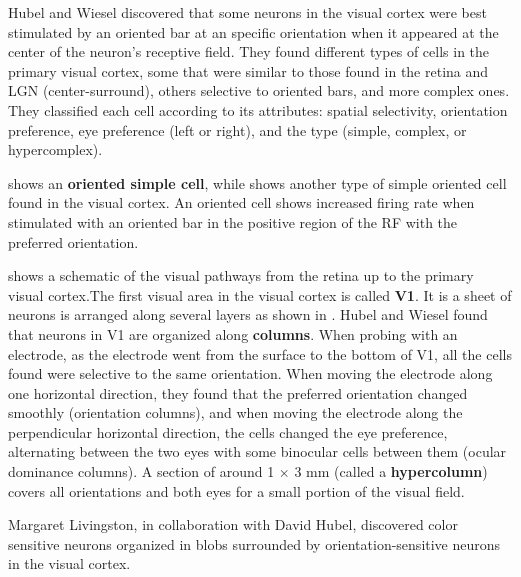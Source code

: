 Hubel and Wiesel discovered that some neurons in the visual cortex were best stimulated by an oriented bar at an specific orientation when it appeared at the center of the neuron's receptive field. They found different types of cells in the primary visual cortex, some that were similar to those found in the retina and LGN (center-surround), others selective to oriented bars, and more complex ones.
They classified each cell according to its attributes: spatial selectivity, orientation preference, eye preference (left or right), and the type (simple, complex, or hypercomplex).

 shows an {\bf oriented simple cell}, while  shows another type of simple oriented cell found in the visual cortex. An oriented cell shows increased firing rate when stimulated with an oriented bar in the positive region of the RF with the preferred orientation.

\Fig{\ref{fig:visual_pathways}}
shows a schematic of the visual pathways from the retina up to the primary visual cortex.The first visual area in the visual cortex is called {\bf V1}. It is a sheet of neurons is arranged along several layers as shown in \fig{\ref{fig:visual_pathways}}. %
Hubel and Wiesel found that neurons in V1 are organized along {\bf columns}. When probing with an electrode, as the electrode went from the surface to the bottom of V1, all the cells found were selective to the same orientation. When moving the electrode along one horizontal direction, they found that the preferred orientation changed smoothly (orientation columns), and when moving the electrode along the perpendicular horizontal direction, the cells changed the eye preference, alternating between the two eyes with some binocular cells between them (ocular dominance columns). A section of around 1 $\times$ 3 mm (called a {\bf hypercolumn})
covers all orientations and both eyes for a small portion of the visual field.

Margaret Livingston, in collaboration with David Hubel, discovered color sensitive neurons \cite{Livingstone1984AnatomyAP} organized in blobs surrounded by orientation-sensitive neurons in the visual cortex.


